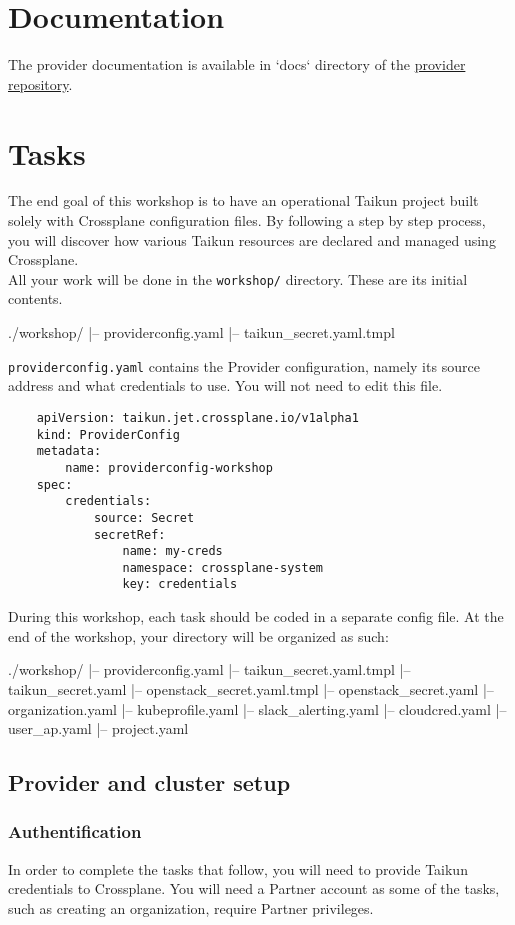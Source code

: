 \section{Documentation}
The provider documentation is available in `docs` directory of the \href{https://github.com/itera-io/provider-jet-taikun/}{provider repository}.

\section{Tasks}
The end goal of this workshop is to have an operational Taikun project built solely with Crossplane
configuration files.
By following a step by step process, you will discover how various Taikun
resources are declared and managed using Crossplane.\\

All your work will be done in the \texttt{workshop/} directory. These are its initial contents.
\begin{raw}
./workshop/
|-- providerconfig.yaml
|-- taikun_secret.yaml.tmpl
\end{raw}
\texttt{providerconfig.yaml} contains the Provider configuration,
namely its source address and what credentials to use.
You will not need to edit this file.
\begin{verbatim}
    apiVersion: taikun.jet.crossplane.io/v1alpha1
    kind: ProviderConfig
    metadata:
        name: providerconfig-workshop
    spec:
        credentials:
            source: Secret
            secretRef:
                name: my-creds
                namespace: crossplane-system
                key: credentials
\end{verbatim}

During this workshop, each task should be coded in a separate config file.
At the end of the workshop, your directory will be organized as such:
\begin{raw}
./workshop/
|-- providerconfig.yaml
|-- taikun_secret.yaml.tmpl
|-- taikun_secret.yaml
|-- openstack_secret.yaml.tmpl
|-- openstack_secret.yaml
|-- organization.yaml
|-- kubeprofile.yaml
|-- slack_alerting.yaml
|-- cloudcred.yaml
|-- user_ap.yaml
|-- project.yaml
\end{raw}

\subsection{Provider and cluster setup}\label{sec:auth}
\subsubsection{Authentification}
In order to complete the tasks that follow, you will need to provide Taikun credentials to Crossplane.
You will need a Partner account as some of the tasks, such as creating an organization,
require Partner privileges.\\

